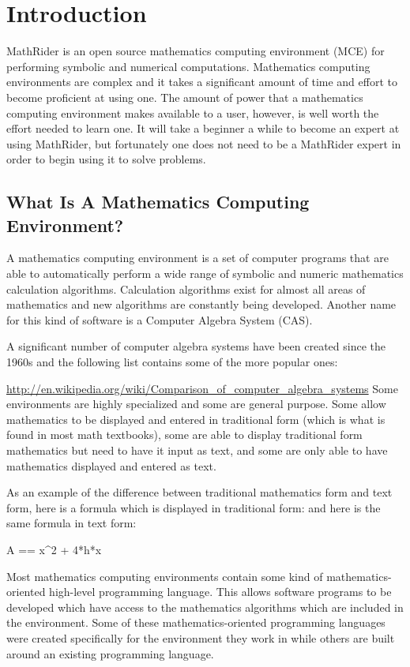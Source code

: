 \documentclass[12pt,oneside]{book}
\begin{document}
\chapter[Introduction]{Introduction}
MathRider is an open source mathematics computing environment (MCE) for performing symbolic and numerical computations. Mathematics computing environments are complex and it takes a significant amount of time and effort to become proficient at using one. The amount of power that a mathematics computing environment makes available to a user, however, is well worth the effort needed to learn one. It will take a beginner a while to become an expert at using MathRider, but fortunately one does not need to be a MathRider expert in order to begin using it to solve problems.

\section[What Is A Mathematics Computing Environment?]{What Is A Mathematics Computing Environment?}

A mathematics computing environment is a set of computer programs that are able to automatically perform a wide range of symbolic and numeric mathematics calculation algorithms. Calculation algorithms exist for almost all areas of mathematics and new algorithms are constantly being developed. Another name for this kind of software is a Computer Algebra System (CAS). 

A significant number of computer algebra systems have been created since the 1960s and the following list contains some of the more popular ones:

\href{http://en.wikipedia.org/wiki/Comparison_of_computer_algebra_systems}{http://en.wikipedia.org/wiki/Comparison\_of\_computer\_algebra\_systems}
Some environments are highly specialized and some are general purpose. Some allow mathematics to be displayed and entered in traditional form (which is what is found in most math textbooks), some are able to display traditional form mathematics but need to have it input as text, and some are only able to have mathematics displayed and entered as text.


As an example of the difference between traditional mathematics form and text form, here is a formula which is displayed in traditional form: 
and here is the same formula in text form:


A == x\^{}2 + 4*h*x


Most mathematics computing environments contain some kind of mathematics{}-oriented high{}-level programming language. This allows software programs to be developed which have access to the mathematics algorithms which are included in the environment. Some of these mathematics{}-oriented programming languages were created specifically for the environment they work in while others are built around an existing programming language. 
\end{document}
